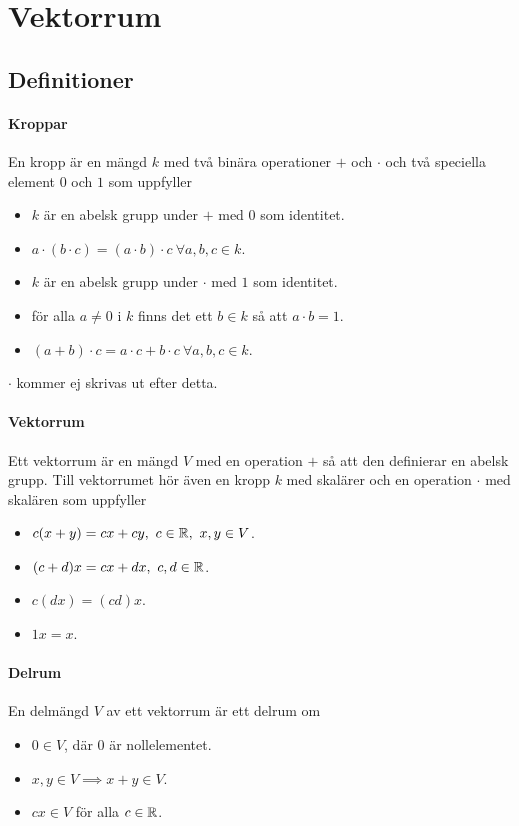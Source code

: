 \section{Vektorrum}

\subsection{Definitioner}

\paragraph{Kroppar}
En kropp är en mängd $k$ med två binära operationer $+$ och $\cdot$ och två speciella element $0$ och $1$ som uppfyller
\begin{itemize}
	\item $k$ är en abelsk grupp under $+$ med $0$ som identitet.
	\item $a\cdot(b\cdot c) = (a\cdot b)\cdot c\ \forall a, b, c\in k$.
	\item $k$ är en abelsk grupp under $\cdot$ med $1$ som identitet.
	\item för alla $a\neq 0$ i $k$ finns det ett $b\in k$ så att $a\cdot b = 1$.
	\item $(a + b)\cdot c = a\cdot c + b\cdot c\ \forall a, b, c\in k$.
\end{itemize}
$\cdot$ kommer ej skrivas ut efter detta.

\paragraph{Vektorrum}
Ett vektorrum är en mängd $V$ med en operation $+$ så att den definierar en abelsk grupp. Till vektorrumet hör även en kropp $k$ med skalärer och en operation $\cdot$ med skalären som uppfyller
\begin{itemize}
	\item $c(x + y) = cx + cy,~c\in\mathbb{R},~x,y\in V$.
	\item $(c + d)x = cx + dx,~c,d\in\mathbb{R}$.
	\item $c(dx) = (cd)x$.
	\item $1x = x$.
\end{itemize}

\paragraph{Delrum}
En delmängd $V$ av ett vektorrum är ett delrum om
\begin{itemize}
	\item $0\in V$, där $0$ är nollelementet.
	\item $x, y\in V\implies x + y\in V$.
	\item $cx\in V$ för alla $c\in\mathbb{R}$.
\end{itemize}

